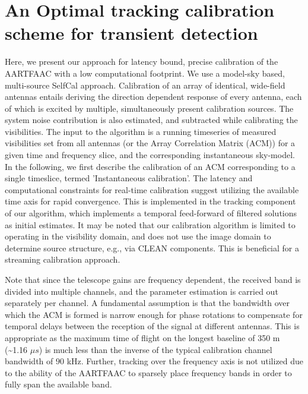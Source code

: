 \documentclass{aa}
\begin{document}
\section{\label{sec:An-Optimal,-tracking}An Optimal tracking calibration
scheme for transient detection}

Here,  we present our  approach for  latency bound,  precise calibration  of the
AARTFAAC  with  a  low  computational  footprint.  We  use  a  model-sky  based,
multi-source  SelfCal approach\citep{wijnholds2009multisource}.   Calibration of
an  array  of identical,  wide-field  antennas  entails  deriving the  direction
dependent  response of every  antenna, each  of which  is excited  by multiple,
simultaneously present  calibration sources.   The system noise  contribution is
also estimated, and subtracted while  calibrating the visibilities. The input to
the  algorithm is a  running timeseries  of measured  visibilities set  from all
antennas (or the Array Correlation Matrix  (ACM)) for a given time and frequency
slice, and the corresponding instantaneous sky-model. In the following, we first
describe the calibration  of an ACM corresponding to  a single timeslice, termed
'Instantaneous  calibration'.  The  latency  and computational  constraints  for
real-time  calibration  suggest utilizing  the  available  time  axis for  rapid
convergence. This  is implemented  in the tracking  component of  our algorithm,
which  implements  a temporal  feed-forward  of  filtered  solutions as  initial
estimates.  It  may  be noted  that  our  calibration  algorithm is  limited  to
operating  in the  visibility  domain, and  does  not use  the  image domain  to
determine source structure, e.g., via CLEAN components. This is beneficial for a
streaming calibration approach.

Note that since  the telescope gains are frequency  dependent, the received band
is divided into  multiple channels, and the parameter  estimation is carried out
separately per  channel.  A  fundamental assumption is  that the  bandwidth over
which the ACM  is formed is narrow enough for phase  rotations to compensate for
temporal   delays   between  the   reception   of   the   signal  at   different
antennas\citep{zatman1998narrow}.  This  is appropriate  as the maximum  time of
flight on the longest baseline of  350 m (\textasciitilde{}1.16 $\mu s$) is much
less than the inverse of the  typical calibration channel bandwidth of $90$ kHz.
Further, tracking over the frequency axis  is not utilized due to the ability of
the  AARTFAAC to  sparsely place  frequency  bands in  order to  fully span  the
available band.
\end{document}
